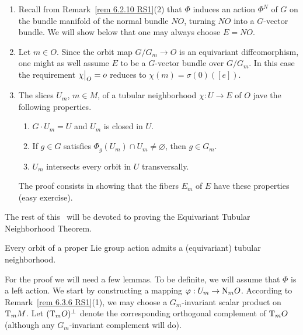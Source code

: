 \begin{rem}
    \begin{enumerate}
        \item Recall from Remark~\ref{rem 6.2.10 RS1}(2) that $\Phi$ induces an action $\Phi^N$ of $G$ on the bundle manifold of the normal bundle $NO$, turning $NO$ into a $G$-vector bundle. We will show below that one may always choose $E=NO$.
        \item Let $m\in O$. Since the orbit map $G\slash G_m\to O$ is an equivariant diffeomorphism, one might as well assume $E$ to be a $G$-vector bundle over $G\slash G_m$. In this case the requirement $\restr{\chi}{O}=o$ reduces to $\chi(m)=\sigma(0)([e])$.
        \item  The slices $U_m$, $m\in M$, of a tubular neighborhood $\chi:U\to E$ of $O$ jave the following properties.
        \begin{enumerate}[label=(\alph*)]
            \item $G\cdot U_m=U$ and $U_m$ is closed in $U$.
            \item If $g\in G$ satisfies $\Phi_g(U_m)\cap U_m\neq \varnothing$, then $g\in G_m$.
            \item $U_m$ intersects every orbit in $U$ transversally.
        \end{enumerate}
        The proof consists in showing that the fibers $E_m$ of $E$ have these properties (easy exercise).
    \end{enumerate}
\end{rem}

The rest of this \subsect\ will be devoted to proving the Equivariant Tubular Neighborhood Theorem.

\begin{thm}\label{thm 6.4.3 RS1 equiv tubular neighb}
    Every orbit of a proper Lie group action admits a (equivariant) tubular neighborhood.
\end{thm}

For the proof we will need a few lemmas. To be definite, we will assume that $\Phi$ is a left action. We start by constructing a mapping $\varphi:U_m\to \mathrm{N}_mO$. According to Remark~\ref{rem 6.3.6 RS1}(1), we may choose a $G_m$-invariant scalar product on $\mathrm{T}_mM$. Let $(\mathrm{T}_mO)^\perp$ denote the corresponding orthogonal complement of $\mathrm{T}_mO$ (although any $G_m$-invariant complement will do).

